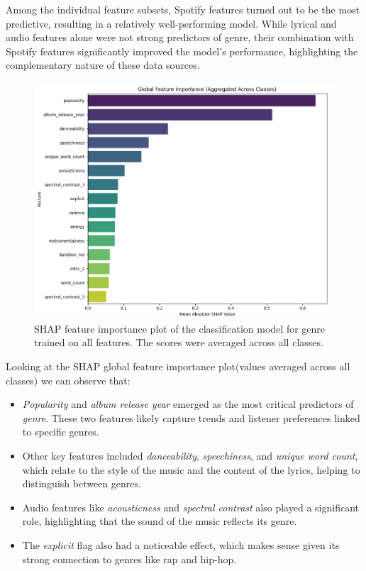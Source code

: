 Among the individual feature subsets, Spotify features turned out to be the
most predictive, resulting in a relatively well-performing model. While lyrical
and audio features alone were not strong predictors of genre, their combination
with Spotify features significantly improved the model's performance,
highlighting the complementary nature of these data sources.





\begin{center}
\begin{figure}[H]
  \centering
  \includegraphics[width=5in]{img/feature_importance_genre_clf.png}
  \caption{SHAP feature importance plot of the classification model for genre
  trained on all features. The scores were averaged across all classes.}
  \label{Figure:fig_eh}
\end{figure}
\end{center}

Looking at the SHAP global feature importance plot(values averaged across all
classes) we can observe that:
\begin{itemize}
  \item \textit{Popularity} and \textit{album release year} emerged as the most
    critical predictors of \textit{genre}. These two features likely capture
    trends and listener preferences linked to specific genres.
  \item Other key features included \textit{danceability},
    \textit{speechiness}, and \textit{unique word count}, which relate to the
    style of the music and the content of the lyrics, helping to distinguish
    between genres. \item Audio features like \textit{acousticness} and
    \textit{spectral contrast} also played a significant role, highlighting
    that the sound of the music reflects its genre. 
  \item The \textit{explicit} flag also had a noticeable effect, which makes
    sense given its strong connection to genres like rap and hip-hop.

\end{itemize}

